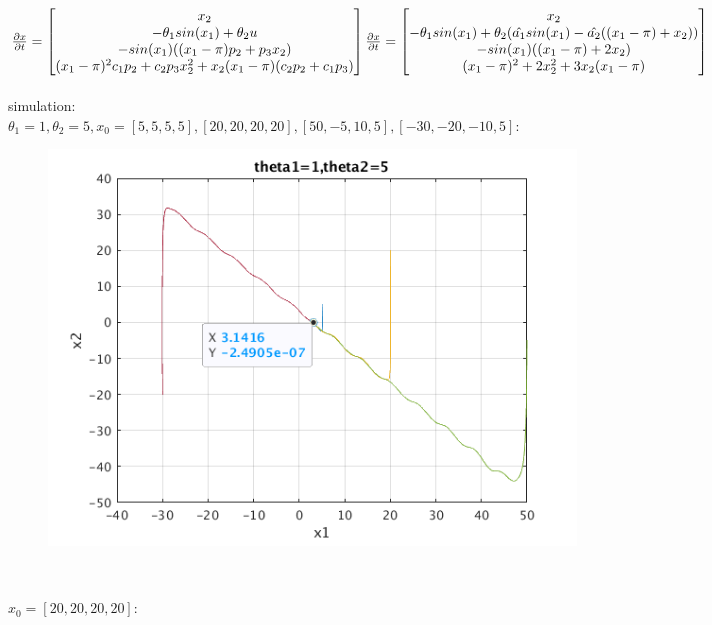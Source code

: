\documentclass[12pt,letter]{article}
\begin{document}
\begin{itemize}
$\frac{\partial x}{\partial t} =
\begin{bmatrix}
  x_2\\
  -\theta_1 sin(x_1)+\theta_2 u\\
  -sin(x_1)((x_1-\pi) p_2 + p_3 x_2)\\
  (x_1-\pi)^2c_1 p_2 + c_2 p_3 x_2^2 + x_2(x_1 -\pi)(c_2 p_2 + c_1 p_3)
\end{bmatrix}\\
\frac{\partial x}{\partial t} =
\begin{bmatrix}
  x_2\\
  -\theta_1 sin(x_1)+\theta_2(\hat{a_1}sin(x_1)-\hat{a_2}((x_1-\pi) + x_2))\\
  -sin(x_1)((x_1-\pi) + 2 x_2)\\
  (x_1-\pi)^2 + 2 x_2^2 + 3x_2(x_1 -\pi)
\end{bmatrix}
$\\
\\

simulation:\\

$\theta_1=1, \theta_2 = 5, x_0=[5,5,5,5], [20,20,20,20], [50,-5,10,5], [-30,-20,-10,5]:$\\

\begin{figure}[h]
  \includegraphics[width=14cm,keepaspectratio]{matlab/3_11/q_3_11_thetas_1_5.png}
\end{figure}\\

\pagebreak

$x_0=[20,20,20,20]:$\\


\end{itemize}
\end{document}
